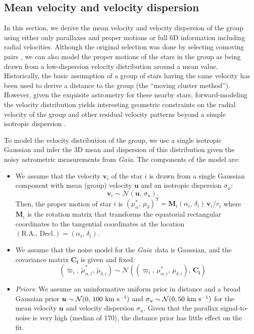 \documentclass[modern,letterpaper]{aastex61}
\newcommand{\project}[1]{\textsl{#1}}
\newcommand{\gaia}{\project{Gaia}}
\newcommand{\normal}{{\mathcal{N}}}
\newcommand{\transp}[1]{{#1}^{\!\mathsf{T}}}
\newcommand{\bs}[1]{\boldsymbol{#1}}
\newcommand{\mat}[1]{\mathbf{#1}}
\renewcommand{\vec}[1]{\bs{#1}}
\newcommand{\kms}{\ensuremath{\rm km~s^{-1}}}
\newcommand{\pmra}{\ensuremath{\mu_\alpha^*}}
\newcommand{\pmdec}{\ensuremath{\mu_\delta}}
\begin{document}
\subsection{Mean velocity and velocity dispersion}
\label{sec:fitting}

In this section, we derive the mean velocity and velocity dispersion of the
group using either only parallaxes and proper motions or full 6D information
including radial velocities.
Although the original selection was done by selecting comoving pairs \citep{2017AJ....153..257O}, we can
also model the proper motions of the stars in the group as being drawn from a low-dispersion velocity distribution around a mean value.
Historically, the basic assumption of a group of stars having the same velocity
has been used to derive a distance to the group (the ``moving cluster method'').
However, given the exquisite astrometry for these nearby stars, forward-modeling the velocity distribution yields interesting
geometric constraints on the radial velocity of the group and other residual
velocity patterns beyond a simple isotropic dispersion
\citep{1999A&A...348.1040D,2002A&A...381..446M}.

To model the velocity distribution of the group, we use a single isotropic Gaussian and infer the 3D mean and dispersion of this distribution given the noisy astrometric measurements from \gaia.
The components of the model are:
\begin{itemize}
  \item We assume that the velocity $\vec{v}_i$ of the star $i$ is drawn from
    a single Gaussian component with mean (group) velocity $\vec{u}$ and
    an isotropic dispersion $\sigma_{u}$:
    \begin{equation}
        \vec{v}_i \sim \normal(\vec{u},\,\sigma_{u}).
    \end{equation}
    Then, the proper motion of star $i$ is
    $\transp{(\pmra,\,\pmdec)} = \mat{M}_i(\alpha_i,\,\delta_i) \, \vec{v}_i / r_i$ where
    $\mat{M}_i$ is the rotation matrix that transforms the equatorial
    rectangular coordinates to the tangential coordinates at the location
    $(\mathrm{R.A.},\,\mathrm{Decl.}) = (\alpha_i,\,\delta_i)$.

  \item We assume that the noise model for the \gaia\ data is Gaussian, and
    the covariance matrix $\mat{C_i}$ is given and fixed:
    \begin{equation}
    (\tilde\varpi_i,\,\tilde\mu_{\alpha,i}^*,\,\tilde\mu_{\delta,i}) \sim
      \normal((\varpi_i,\,\mu_{\alpha,i}^*,\,\mu_{\delta,i}),\,\mat{C_i})
    \end{equation}

  \item \emph{Priors}:
    We assume an uninformative uniform prior in distance and a broad Gaussian
    prior $\vec{u} \sim \normal(0,\,100~\kms)$ and $\sigma_u \sim \normal(0, 50~\kms)$
    for the mean velocity $\vec{u}$ and velocity dispersion $\sigma_u$.
    Given that the parallax signal-to-noise is very high (median of 170),
    the distance prior has little effect on the fit.
\end{itemize}
\end{document}
